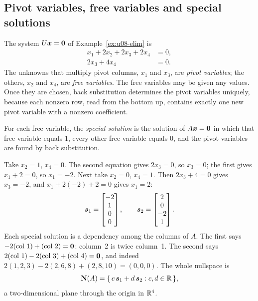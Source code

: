 \subsection{Pivot variables, free variables and special solutions}

The system $U\boldsymbol{x}=\boldsymbol{0}$ of Example~\ref{ex:u08-elim} is
\begin{align*}
x_1+2x_2+2x_3+2x_4&=0,\\
2x_3+4x_4&=0.
\end{align*}
The unknowns that multiply pivot columns, $x_1$ and $x_3$, are \emph{pivot variables}; the
others, $x_2$ and $x_4$, are \emph{free variables}. The free variables may be given any values.
Once they are chosen, back substitution determines the pivot variables uniquely, because each
nonzero row, read from the bottom up, contains exactly one new pivot variable with a nonzero
coefficient.

\begin{definition}\label{def:u08-special}
For each free variable, the \emph{special solution} is the solution of $A\boldsymbol{x}=\boldsymbol{0}$ in
which that free variable equals $1$, every other free variable equals $0$, and the pivot
variables are found by back substitution.
\end{definition}

\begin{example}\label{ex:u08-special}
Take $x_2=1$, $x_4=0$. The second equation gives $2x_3=0$, so $x_3=0$; the first gives
$x_1+2=0$, so $x_1=-2$. Next take $x_2=0$, $x_4=1$. Then $2x_3+4=0$ gives $x_3=-2$, and
$x_1+2(-2)+2=0$ gives $x_1=2$:
\[
\boldsymbol{s}_1=\begin{bmatrix}-2\\1\\0\\0\end{bmatrix},\qquad
\boldsymbol{s}_2=\begin{bmatrix}2\\0\\-2\\1\end{bmatrix}.
\]
Each special solution is a dependency among the columns of $A$. The first says
$-2(\text{col }1)+(\text{col }2)=\boldsymbol{0}$: column~2 is twice column~1. The second says
$2(\text{col }1)-2(\text{col }3)+(\text{col }4)=\boldsymbol{0}$, and indeed
$2(1,2,3)-2(2,6,8)+(2,8,10)=(0,0,0)$. The whole nullspace is
\[
\mathbf{N}(A)=\{\,c\,\boldsymbol{s}_1+d\,\boldsymbol{s}_2 : c,d\in\mathbb{R}\,\},
\]
a two-dimensional plane through the origin in $\mathbb{R}^4$.
\end{example}

